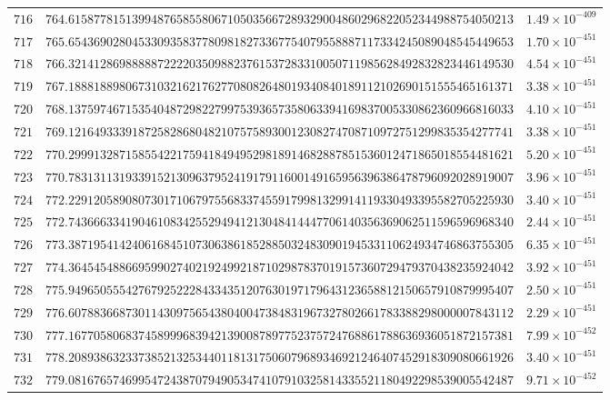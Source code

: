 \documentclass[12pt,reqno]{amsart}
\theoremstyle{remark}
\begin{document}
\begin{longtable}{clc}
$716$ & $764.6158778151399487658558067105035667289329004860296822052344988754050213$ & $1.49\times 10^{-409}$ \\
$717$ & $765.6543690280453309358377809818273367754079558887117334245089048545449653$ & $1.70\times 10^{-451}$ \\
$718$ & $766.3214128698888872222035098823761537283310050711985628492832823446149530$ & $4.54\times 10^{-451}$ \\
$719$ & $767.1888188980673103216217627708082648019340840189112102690151555465161371$ & $3.38\times 10^{-451}$ \\
$720$ & $768.1375974671535404872982279975393657358063394169837005330862360966816033$ & $4.10\times 10^{-451}$ \\
$721$ & $769.1216493339187258286804821075758930012308274708710972751299835354277741$ & $3.38\times 10^{-451}$ \\
$722$ & $770.2999132871585542217594184949529818914682887851536012471865018554481621$ & $5.20\times 10^{-451}$ \\
$723$ & $770.7831311319339152130963795241917911600149165956396386478796092028919007$ & $3.96\times 10^{-451}$ \\
$724$ & $772.2291205890807301710679755683374559179981329914119330493395582705225930$ & $3.40\times 10^{-451}$ \\
$725$ & $772.7436663341904610834255294941213048414447706140356369062511596596968340$ & $2.44\times 10^{-451}$ \\
$726$ & $773.3871954142406168451073063861852885032483090194533110624934746863755305$ & $6.35\times 10^{-451}$ \\
$727$ & $774.3645454886695990274021924992187102987837019157360729479370438235924042$ & $3.92\times 10^{-451}$ \\
$728$ & $775.9496505554276792522284334351207630197179643123658812150657910879995407$ & $2.50\times 10^{-451}$ \\
$729$ & $776.6078836687301143097565438040047384831967327802661783388298000007843112$ & $2.29\times 10^{-451}$ \\
$730$ & $777.1677058068374589996839421390087897752375724768861788636936051872157381$ & $7.99\times 10^{-452}$ \\
$731$ & $778.2089386323373852132534401181317506079689346921246407452918309080661926$ & $3.40\times 10^{-451}$ \\
$732$ & $779.0816765746995472438707949053474107910325814335521180492298539005542487$ & $9.71\times 10^{-452}$ \\

\end{longtable}
\end{document}
